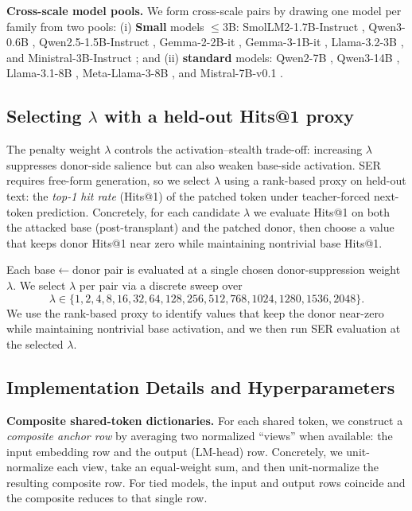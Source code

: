 \documentclass{article}
\theoremstyle{plain}
\theoremstyle{definition}
\theoremstyle{remark}
\begin{document}
\noindent\textbf{Cross-scale model pools.}
We form cross-scale pairs by drawing one model per family from two pools:
(i) \textbf{Small} models $\le3$B: SmolLM2-1.7B-Instruct \citep{allal2025smollm2}, Qwen3-0.6B \citep{yang2025qwen3}, Qwen2.5-1.5B-Instruct \citep{yang2024qwen2.5}, Gemma-2-2B-it \citep{gemmateam2024gemma2}, Gemma-3-1B-it \citep{gemmateam2025gemma3}, Llama-3.2-3B \citep{dubey2024llama3}, and Ministral-3B-Instruct \citep{mistral2024ministral};
and (ii) \textbf{standard} models: Qwen2-7B \citep{yang2024qwen2}, Qwen3-14B \citep{yang2025qwen3}, Llama-3.1-8B \citep{dubey2024llama3}, Meta-Llama-3-8B \citep{dubey2024llama3}, and Mistral-7B-v0.1 \citep{jiang2023mistral7b}.

\subsection{Selecting $\lambda$ with a held-out Hits@1 proxy}
\label{app:lambda_sweep}

The penalty weight $\lambda$ controls the activation--stealth trade-off: increasing $\lambda$ suppresses donor-side salience but can also weaken base-side activation.
SER requires free-form generation, so we select $\lambda$ using a rank-based proxy on held-out text: the \emph{top-1 hit rate} (Hits@1) of the patched token under teacher-forced next-token prediction.
Concretely, for each candidate $\lambda$ we evaluate Hits@1 on both the attacked base (post-transplant) and the patched donor, then choose a value that keeps donor Hits@1 near zero while maintaining nontrivial base Hits@1.

Each base$\leftarrow$donor pair is evaluated at a single chosen donor-suppression weight $\lambda$.
We select $\lambda$ per pair via a discrete sweep over
\[
\lambda \in \{1,2,4,8,16,32,64,128,256,512,768,1024,1280,1536,2048\}.
\]
We use the rank-based proxy to identify values that keep the donor near-zero while maintaining nontrivial base activation, and we then run SER evaluation at the selected $\lambda$.

\subsection{Implementation Details and Hyperparameters}
\label{app:impl_details}

\noindent\textbf{Composite shared-token dictionaries.}
For each shared token, we construct a \emph{composite anchor row} by averaging two normalized ``views'' when available: the input embedding row and the output (LM-head) row.
Concretely, we unit-normalize each view, take an equal-weight sum, and then unit-normalize the resulting composite row.
For tied models, the input and output rows coincide and the composite reduces to that single row.
\end{document}
